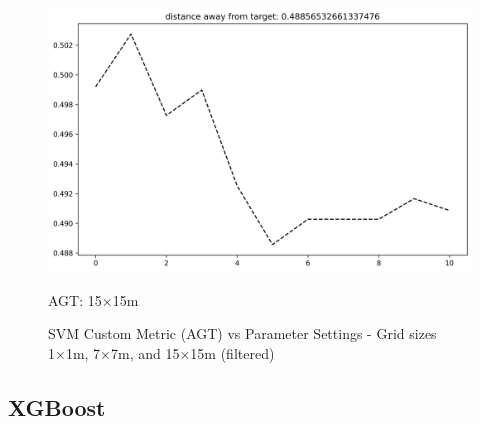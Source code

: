 \documentclass[runningheads]{llncs}
\begin{document}
\begin{figure}[H]
\begin{minipage}{0.32\textwidth}
		\includegraphics[width=\textwidth]{figures/svm_custom_15.png}
		\caption*{AGT: 15×15m}
	\end{minipage}
	\caption{SVM Custom Metric (AGT) vs Parameter Settings - Grid sizes 1×1m, 7×7m, and 15×15m (filtered)}
\end{figure}

\clearpage

\subsection*{XGBoost}
\end{document}
